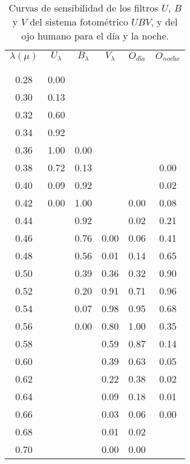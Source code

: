 \documentclass[12pt,a4paper]{practice}
\begin{document}
\begin{problem}
        \begin{table}[h!]
            \centering
            \begin{tabular}{ c | c | c | c | c | c }
                $\lambda(\mu)$  & $U_\lambda$  & $B_\lambda$  & $V_\lambda$  & $O_{\textit{d\'ia}}$  & $O_{\textit{noche}}$ \\
                &  &  &  &  &  \\[-0.8em]\hline
                &  &  &  &  &  \\[-0.8em]
                0.28  & 0.00  &  &  &  &  \\
                0.30  & 0.13  &  &  &  &  \\
                0.32  & 0.60  &  &  &  &  \\
                0.34  & 0.92  &  &  &  &  \\
                0.36  & 1.00  & 0.00  &  &  &  \\
                0.38  & 0.72  & 0.13  &  &  & 0.00 \\
                0.40  & 0.09  & 0.92  &  &  & 0.02 \\
                0.42  & 0.00  & 1.00  &  & 0.00  & 0.08 \\
                0.44  &  & 0.92  &  & 0.02  & 0.21 \\
                0.46  &  & 0.76  & 0.00  & 0.06  & 0.41 \\
                0.48  &  & 0.56  & 0.01  & 0.14  & 0.65 \\
                0.50  &  & 0.39  & 0.36  & 0.32  & 0.90 \\
                0.52  &  & 0.20  & 0.91  & 0.71  & 0.96 \\
                0.54  &  & 0.07  & 0.98  & 0.95  & 0.68 \\
                0.56  &  & 0.00  & 0.80  & 1.00  & 0.35 \\
                0.58  &  &  & 0.59  & 0.87  & 0.14 \\
                0.60  &  &  & 0.39  & 0.63  & 0.05 \\
                0.62  &  &  & 0.22  & 0.38  & 0.02 \\
                0.64  &  &  & 0.09  & 0.18  & 0.01 \\
                0.66  &  &  & 0.03  & 0.06  & 0.00 \\
                0.68  &  &  & 0.01  & 0.02  &  \\
                0.70  &  &  & 0.00  & 0.00  &  \\
                \hline
            \end{tabular}
            \caption{
                Curvas de sensibilidad de los filtros $U$, $B$ y $V$ del sistema fotométrico $UBV$, y del ojo humano para el día y la noche.
            }\label{table:1}
        \end{table}
    \end{problem}
\end{document}
